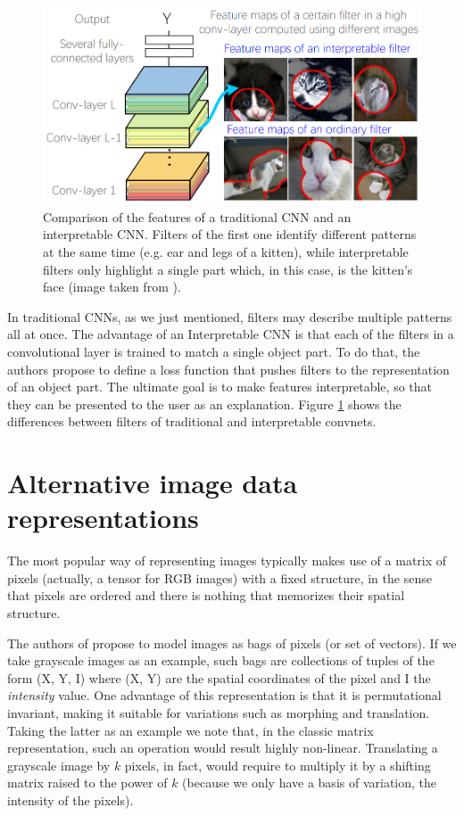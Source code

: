\documentclass[12pt, twoside, a4paper]{report}
\begin{document}
\begin{figure}
\centering
\includegraphics[width=.9\linewidth]{images/paper-images/interpretable-convnets.png}
\caption{Comparison of the features of a traditional CNN and an interpretable CNN. Filters of the first one identify different patterns at the same time (e.g. ear and legs of a kitten), while interpretable filters only highlight a single part which, in this case, is the kitten's face (image taken from \cite{interpretable-convnets}).}
\label{fig:interpretable-convnets}
\end{figure}


In traditional CNNs, as we just mentioned, filters may describe multiple patterns all at once. The advantage of an Interpretable CNN is that each of the filters in a convolutional layer is trained to match a single object part. To do that, the authors propose to define a loss function that pushes filters to the representation of an object part.
The ultimate goal is to make features interpretable, so that they can be presented to the user as an explanation.
Figure \ref{fig:interpretable-convnets} shows the differences between filters of traditional and interpretable convnets. 

\section{Alternative image data representations}

The most popular way of representing images typically makes use of a matrix of pixels (actually, a tensor for RGB images) with a fixed structure, in the sense that pixels are ordered and there is nothing that memorizes their spatial structure.

The authors of \cite{bag-of-pixels} propose to model images as bags of pixels (or set of vectors). If we take grayscale images as an example, such bags are collections of tuples of the form (X, Y, I) where (X, Y) are the spatial coordinates of the pixel and I the \textit{intensity} value. One advantage of this representation is that it is permutational invariant, making it suitable for variations such as morphing and translation. Taking the latter as an example we note that, in the classic matrix representation, such an operation would result highly non-linear. Translating a grayscale image by $k$ pixels, in fact, would require to multiply it by a shifting matrix raised to the power of $k$ (because we only have a basis of variation, the intensity of the pixels). 
\end{document}
